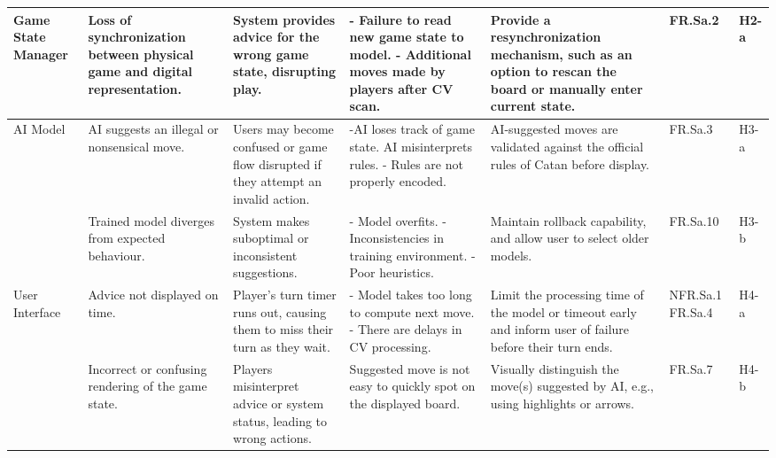 \documentclass{article}
\begin{document}
\begin{landscape}
\begin{tabularx}{\linewidth}{|P{2.3cm}|Y|Y|Y|Y|P{1.4cm}|P{0.8cm}|}
        \hline

        Game State Manager &
        Loss of synchronization between physical game and digital representation. &
        System provides advice for the wrong game state, disrupting play. &
        - Failure to read new game state to model. \newline - Additional moves made by players after CV scan. &
        Provide a resynchronization mechanism, such as an option to rescan the board or manually enter current state. &
        FR.Sa.2 &
        H2-a \\

        \hline

        AI Model &
        AI suggests an illegal or nonsensical move. &
        Users may become confused or game flow disrupted if they attempt an invalid action. &
        -AI loses track of game state. \newline AI misinterprets rules. \newline - Rules are not properly encoded. &
        AI-suggested moves are validated against the official rules of Catan before display. &
        FR.Sa.3 &
        H3-a \\

        &
        Trained model diverges from expected behaviour. &
        System makes suboptimal or inconsistent suggestions. &
        - Model overfits. \newline - Inconsistencies in training environment. \newline - Poor heuristics. &
        Maintain rollback capability, and allow user to select older models. &
        FR.Sa.10 &
        H3-b \\

        \hline

        User Interface &
        Advice not displayed on time. &
        Player's turn timer runs out, causing them to miss their turn as they wait. &
        - Model takes too long to compute next move. \newline - There are delays in CV processing. &
        Limit the processing time of the model or timeout early and inform user of failure before their turn ends. &
        NFR.Sa.1 \newline FR.Sa.4 &
        H4-a \\

        &
        Incorrect or confusing rendering of the game state. &
        Players misinterpret advice or system status, leading to wrong actions. &
        Suggested move is not easy to quickly spot on the displayed board. &
        Visually distinguish the move(s) suggested by AI, e.g., using highlights or arrows. &
        FR.Sa.7 &
        H4-b \\


\end{tabularx}
\end{landscape}
\end{document}
